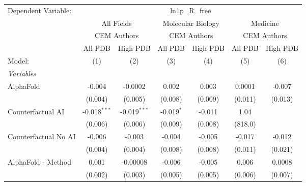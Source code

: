 \begingroup
\centering
\begin{tabular}{lcccccc}
   \tabularnewline \midrule \midrule
   Dependent Variable: & \multicolumn{6}{c}{ln1p\_R\_free}\\
 & \multicolumn{2}{c}{All Fields} & \multicolumn{2}{c}{Molecular Biology} & \multicolumn{2}{c}{Medicine} \\
\cmidrule(lr){2-3} \cmidrule(lr){4-5} \cmidrule(lr){6-7}
 & \multicolumn{2}{c}{CEM Authors} & \multicolumn{2}{c}{CEM Authors} & \multicolumn{2}{c}{CEM Authors} \\
\cmidrule(lr){2-3} \cmidrule(lr){4-5} \cmidrule(lr){6-7}
 & \multicolumn{1}{c}{All PDB} & \multicolumn{1}{c}{High PDB} & \multicolumn{1}{c}{All PDB} & \multicolumn{1}{c}{High PDB} & \multicolumn{1}{c}{All PDB} & \multicolumn{1}{c}{High PDB} \\
\cmidrule(lr){2-2} \cmidrule(lr){3-3} \cmidrule(lr){4-4} \cmidrule(lr){5-5} \cmidrule(lr){6-6} \cmidrule(lr){7-7}
   Model:                                                     & (1)            & (2)            & (3)          & (4)       & (5)     & (6)\\  
   \midrule
   \emph{Variables}\\
   AlphaFold                                                  & -0.004         & -0.0002        & 0.002        & 0.003     & 0.0001  & -0.007\\   
                                                              & (0.004)        & (0.005)        & (0.008)      & (0.009)   & (0.011) & (0.013)\\   
   Counterfactual AI                                          & -0.018$^{***}$ & -0.019$^{***}$ & -0.019$^{*}$ & -0.011    & 1.04    &   \\   
                                                              & (0.006)        & (0.006)        & (0.009)      & (0.008)   & (818.0) &   \\   
   Counterfactual No AI                                       & -0.006         & -0.003         & -0.004       & -0.005    & -0.017  & -0.012\\   
                                                              & (0.004)        & (0.004)        & (0.008)      & (0.008)   & (0.011) & (0.021)\\   
   AlphaFold - Method                                         & 0.001          & -0.00008       & -0.006       & -0.005    & 0.006   & 0.0008\\   
                                                              & (0.002)        & (0.003)        & (0.005)      & (0.005)   & (0.006) & (0.007)\\   

\end{tabular}
